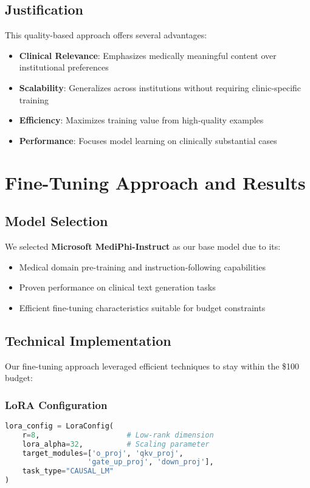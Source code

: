 \documentclass[11pt,letterpaper]{article}
\begin{document}
\subsection{Justification}

This quality-based approach offers several advantages:
\begin{itemize}
    \item \textbf{Clinical Relevance}: Emphasizes medically meaningful content over institutional preferences
    \item \textbf{Scalability}: Generalizes across institutions without requiring clinic-specific training
    \item \textbf{Efficiency}: Maximizes training value from high-quality examples
    \item \textbf{Performance}: Focuses model learning on clinically substantial cases
\end{itemize}

\section{Fine-Tuning Approach and Results}

\subsection{Model Selection}
We selected \textbf{Microsoft MediPhi-Instruct} as our base model due to its:
\begin{itemize}
    \item Medical domain pre-training and instruction-following capabilities
    \item Proven performance on clinical text generation tasks
    \item Efficient fine-tuning characteristics suitable for budget constraints
\end{itemize}

\subsection{Technical Implementation}
Our fine-tuning approach leveraged efficient techniques to stay within the \$100 budget:

\subsubsection{LoRA Configuration}
\begin{lstlisting}[language=Python]
lora_config = LoraConfig(
    r=8,                    # Low-rank dimension
    lora_alpha=32,          # Scaling parameter
    target_modules=['o_proj', 'qkv_proj',
                   'gate_up_proj', 'down_proj'],
    task_type="CAUSAL_LM"
)
\end{lstlisting}
\end{document}

